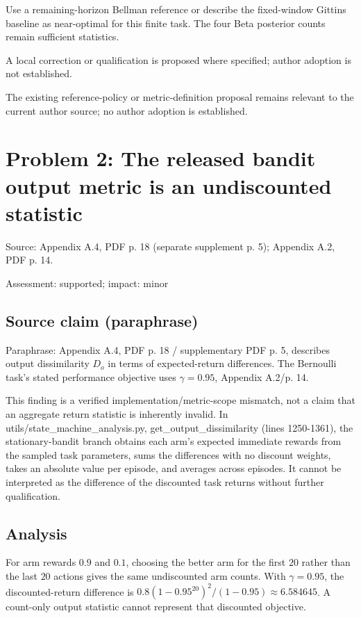 \documentclass[11pt]{article}
\begin{document}
Use a remaining-horizon Bellman reference or describe the fixed-window Gittins baseline as near-optimal for this finite task. The four Beta posterior counts remain sufficient statistics.

A local correction or qualification is proposed where specified; author adoption is not established.

The existing reference-policy or metric-definition proposal remains relevant to the current author source; no author adoption is established.

\section*{Problem 2: The released bandit output metric is an undiscounted statistic}

Source: Appendix A.4, PDF p. 18 (separate supplement p. 5); Appendix A.2, PDF p. 14.

Assessment: supported; impact: minor

\subsection*{Source claim (paraphrase)}

Paraphrase: Appendix A.4, PDF p. 18 / supplementary PDF p. 5, describes output dissimilarity \(D_o\) in terms of expected-return differences. The Bernoulli task’s stated performance objective uses \(\gamma=0.95\), Appendix A.2/p. 14.

This finding is a verified implementation/metric-scope mismatch, not a claim that an aggregate return statistic is inherently invalid. In utils/state\_machine\_analysis.py, get\_output\_dissimilarity (lines 1250-1361), the stationary-bandit branch obtains each arm’s expected immediate rewards from the sampled task parameters, sums the differences with no discount weights, takes an absolute value per episode, and averages across episodes. It cannot be interpreted as the difference of the discounted task returns without further qualification.

\subsection*{Analysis}

For arm rewards \(0.9\) and \(0.1\), choosing the better arm for the first \(20\) rather than the last \(20\) actions gives the same undiscounted arm counts. With \(\gamma=0.95\), the discounted-return difference is \(0.8(1-0.95^{20})^2/(1-0.95)\approx6.584645\). A count-only output statistic cannot represent that discounted objective.
\end{document}
